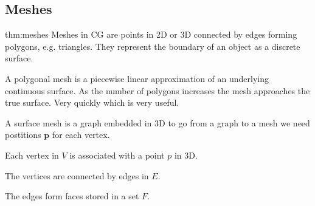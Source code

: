 \documentclass{article}
\begin{document}
\newpage
\subsection{Meshes}

\begin{defin}[Meshes]{thm:meshes}
    Meshes in CG are points in 2D or 3D connected by edges forming polygons, e.g. triangles.
    They represent the boundary of an object as a discrete surface.

    \vspace{5px}
    
    A polygonal mesh is a piecewise linear approximation of an underlying continuous surface.
    As the number of polygons increases the mesh approaches the true surface. Very quickly
    which is very useful.

    A surface mesh is a graph embedded in 3D to go from a graph to a mesh we need postitions \(\mathbf{p}\)
    for each vertex.

    \vspace{10px}

    Each vertex in \(V\) is associated with a point \(p\) in 3D.

    \vspace{5px}

    The vertices are connected by edges in \(E\).

    \vspace{5px}

    The edges form faces stored in a set \(F\). 
\end{defin}
\end{document}
